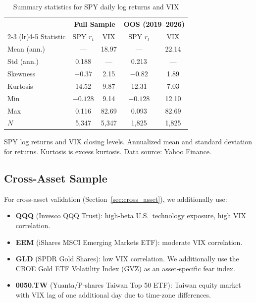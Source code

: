 \documentclass[12pt,a4paper]{article}
\begin{document}
\begin{table}[H]
\centering
\caption{Summary statistics for SPY daily log returns and VIX}
\label{tab:summary_stats}
\begin{threeparttable}
\begin{tabular}{@{}lcccc@{}}
\toprule
& \multicolumn{2}{c}{Full Sample} & \multicolumn{2}{c}{OOS (2019--2026)} \\
\cmidrule(lr){2-3} \cmidrule(lr){4-5}
Statistic & SPY $r_t$ & VIX & SPY $r_t$ & VIX \\
\midrule
Mean (ann.) & --- & 18.97 & --- & 22.14 \\
Std (ann.)  & 0.188 & --- & 0.213 & --- \\
Skewness    & $-0.37$ & 2.15 & $-0.82$ & 1.89 \\
Kurtosis    & 14.52 & 9.87 & 12.31 & 7.03 \\
Min         & $-0.128$ & 9.14 & $-0.128$ & 12.10 \\
Max         & 0.116 & 82.69 & 0.093 & 82.69 \\
$N$         & 5,347 & 5,347 & 1,825 & 1,825 \\
\bottomrule
\end{tabular}
\begin{tablenotes}
\footnotesize
\item SPY log returns and VIX closing levels. Annualized mean and standard deviation for returns. Kurtosis is excess kurtosis. Data source: Yahoo Finance.
\end{tablenotes}
\end{threeparttable}
\end{table}

\subsection{Cross-Asset Sample}

For cross-asset validation (Section~\ref{sec:cross_asset}), we additionally use:
\begin{itemize}
\item \textbf{QQQ} (Invesco QQQ Trust): high-beta U.S.\ technology exposure, high VIX correlation.
\item \textbf{EEM} (iShares MSCI Emerging Markets ETF): moderate VIX correlation.
\item \textbf{GLD} (SPDR Gold Shares): low VIX correlation. We additionally use the CBOE Gold ETF Volatility Index (GVZ) as an asset-specific fear index.
\item \textbf{0050.TW} (Yuanta/P-shares Taiwan Top 50 ETF): Taiwan equity market with VIX lag of one additional day due to time-zone differences.
\end{itemize}
\end{document}
